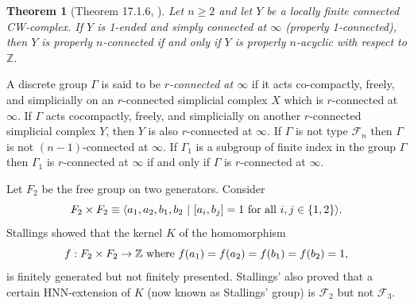 \documentclass[12pt]{article}
\newtheorem{theorem}{Theorem}[subsection]
\begin{document}
\begin{theorem} [Theorem 17.1.6, \cite{G}] \label{PHT}  Let $n\geq 2$ and let $Y$
be a locally finite connected CW-complex. If $Y$ is 1-ended and simply connected at $\infty$ (properly 1-connected), then $Y$ is properly $n$-connected if and only if  $Y$ is properly $n$-acyclic
with respect to $\mathbb Z$.
\end{theorem}

A discrete group $\Gamma$ is said to be {\it $r$-connected at $\infty$} if it acts co-compactly, freely, and simplicially on an $r$-connected simplicial complex $X$ which is $r$-connected at $\infty$. If $\Gamma$ acts cocompactly, freely, and simplicially on another $r$-connected simplicial complex $Y$, then $Y$ is also $r$-connected at $\infty$. If $\Gamma$ is not type $\mathcal F_n$ then $\Gamma$ is not $(n-1)$-connected at $\infty$. If $\Gamma_1$ is a subgroup of finite index in the group $\Gamma$ then $\Gamma_1$ is $r$-connected at $\infty$ if and only if $\Gamma$ is $r$-connected at $\infty$.
 


Let $F_2$ be the free group on two generators.  Consider
$$F_2\times F_2\equiv \langle a_1,a_2, b_1,b_2 \ |\  [a_i,b_j]=1\hbox{ for all } i,j\in \{1,2\}\rangle.$$ 
Stallings \cite{Stall63} showed that the kernel $K$ of the homomorphism $$f:F_2\times F_2\to \mathbb Z\hbox{ where } f(a_1)=f(a_2)=f(b_1)=f(b_2)=1,$$
is finitely generated but not finitely presented. Stallings' also proved that a certain HNN-extension of $K$ (now known as Stallings' group) is $\mathcal F_2$ but not $\mathcal F_3$.
\end{document}
